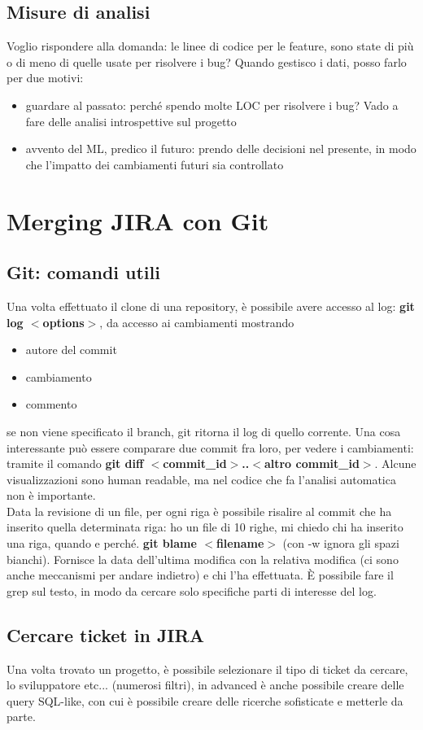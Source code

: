 \documentclass{article}
\begin{document}
\subsection{Misure di analisi}
Voglio rispondere alla domanda: le linee di codice per le feature, sono state di più o di meno di quelle usate per risolvere i bug? Quando gestisco i dati, posso farlo per due motivi:
\begin{itemize}
\item guardare al passato: perché spendo molte LOC per risolvere i bug? Vado a fare delle analisi introspettive sul progetto
\item avvento del ML, predico il futuro: prendo delle decisioni nel presente, in modo che l'impatto dei cambiamenti futuri sia controllato
\end{itemize}
\section{Merging JIRA con Git}
\subsection{Git: comandi utili}
Una volta effettuato il clone di una repository, è possibile avere accesso al log: \textbf{git log $<$options$>$}, da accesso ai cambiamenti mostrando
\begin{itemize}
\item autore del commit
\item cambiamento
\item commento 
\end{itemize}
se non viene specificato il branch, git ritorna il log di quello corrente. Una cosa interessante può essere comparare due commit fra loro, per vedere i cambiamenti: tramite il comando \textbf{git diff $<$commit\_id$>$..$<$altro commit\_id$>$}. Alcune visualizzazioni sono human readable, ma nel codice che fa l'analisi automatica non è importante.\\
Data la revisione di un file, per ogni riga è possibile risalire al commit che ha inserito quella determinata riga: ho un file di 10 righe, mi chiedo chi ha inserito una riga, quando e perché. \textbf{git blame $<$filename$>$} (con -w ignora gli spazi bianchi). Fornisce la data dell'ultima modifica con la relativa modifica (ci sono anche meccanismi per andare indietro) e chi l'ha effettuata. È possibile fare il grep sul testo, in modo da cercare solo specifiche parti di interesse del log.
\subsection{Cercare ticket in JIRA}
Una volta trovato un progetto, è possibile selezionare il tipo di ticket da cercare, lo sviluppatore etc... (numerosi filtri), in advanced è anche possibile creare delle query SQL-like, con cui è possibile creare delle ricerche sofisticate e metterle da parte.
\end{document}
